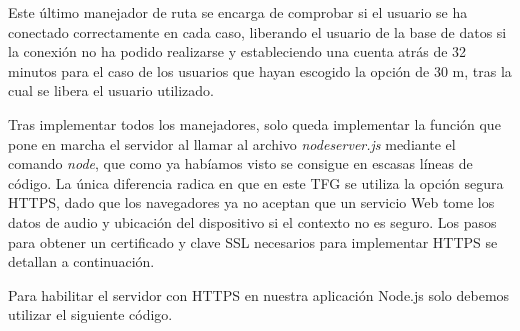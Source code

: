 
Este último manejador de ruta se encarga de comprobar si el usuario se ha conectado correctamente en cada caso, liberando el usuario de la base de datos si la conexión no ha podido realizarse y estableciendo una cuenta atrás de 32 minutos para el caso de los usuarios que hayan escogido la opción de 30 m, tras la cual se libera el usuario utilizado.

Tras implementar todos los manejadores, solo queda implementar la función que pone en marcha el servidor al llamar al archivo \emph{nodeserver.js} mediante el comando \emph{node}, que como ya habíamos visto se consigue en escasas líneas de código. La única diferencia radica en que en este TFG se utiliza la opción segura HTTPS, dado que los navegadores ya no aceptan que un servicio Web tome los datos de audio y ubicación del dispositivo si el contexto no es seguro. Los pasos para obtener un certificado y clave \acrshort{SSL} necesarios para implementar HTTPS se detallan a continuación.

Para habilitar el servidor con HTTPS en nuestra aplicación Node.js solo debemos utilizar el siguiente código.


